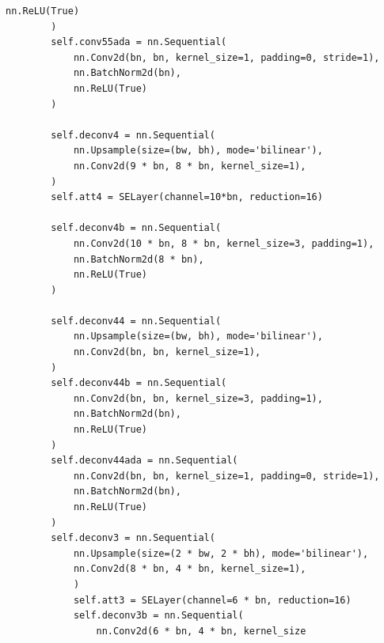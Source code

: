 \begin{lstlisting}[caption= Продолжение листинга A.1]
            nn.ReLU(True)
        )
        self.conv55ada = nn.Sequential(
            nn.Conv2d(bn, bn, kernel_size=1, padding=0, stride=1),
            nn.BatchNorm2d(bn),
            nn.ReLU(True)
        )

        self.deconv4 = nn.Sequential(
            nn.Upsample(size=(bw, bh), mode='bilinear'),
            nn.Conv2d(9 * bn, 8 * bn, kernel_size=1),
        )
        self.att4 = SELayer(channel=10*bn, reduction=16)

        self.deconv4b = nn.Sequential(
            nn.Conv2d(10 * bn, 8 * bn, kernel_size=3, padding=1),
            nn.BatchNorm2d(8 * bn),
            nn.ReLU(True)
        )

        self.deconv44 = nn.Sequential(
            nn.Upsample(size=(bw, bh), mode='bilinear'),
            nn.Conv2d(bn, bn, kernel_size=1),
        )
        self.deconv44b = nn.Sequential(
            nn.Conv2d(bn, bn, kernel_size=3, padding=1),
            nn.BatchNorm2d(bn),
            nn.ReLU(True)
        )
        self.deconv44ada = nn.Sequential(
            nn.Conv2d(bn, bn, kernel_size=1, padding=0, stride=1),
            nn.BatchNorm2d(bn),
            nn.ReLU(True)
        )
        self.deconv3 = nn.Sequential(
            nn.Upsample(size=(2 * bw, 2 * bh), mode='bilinear'),
            nn.Conv2d(8 * bn, 4 * bn, kernel_size=1),
            )
            self.att3 = SELayer(channel=6 * bn, reduction=16)
            self.deconv3b = nn.Sequential(
                nn.Conv2d(6 * bn, 4 * bn, kernel_size
\end{lstlisting}

